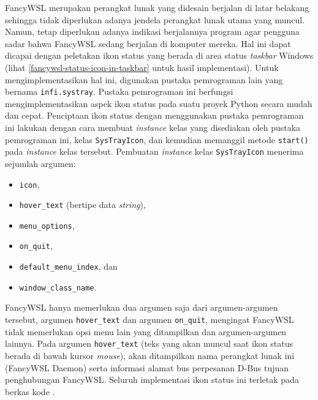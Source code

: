 FancyWSL merupakan perangkat lunak yang didesain berjalan di latar belakang sehingga tidak diperlukan adanya jendela perangkat lunak utama yang muncul. Namun, tetap diperlukan adanya indikasi berjalannya program agar pengguna sadar bahwa FancyWSL sedang berjalan di komputer mereka. Hal ini dapat dicapai dengan peletakan ikon status yang berada di area status \textit{taskbar} Windows (lihat \autoref{fancywsl-status-icon-in-taskbar} untuk hasil implementasi). Untuk mengimplementasikan hal ini, digunakan pustaka pemrograman lain yang bernama \verb|infi.systray|. Pustaka pemrograman ini berfungsi mengimplementasikan aspek ikon status pada suatu proyek Python secara mudah dan cepat. Penciptaan ikon status dengan menggunakan pustaka pemrograman ini lakukan dengan cara membuat \textit{instance} kelas yang disediakan oleh pustaka pemrograman ini, kelas \verb|SysTrayIcon|, dan kemudian memanggil metode \verb|start()| pada \textit{instance} kelas tersebut. Pembuatan \textit{instance} kelas \verb|SysTrayIcon| menerima sejumlah argumen:
\begin{itemize}
    \item \verb|icon|,
    \item \verb|hover_text| (bertipe data \textit{string}),
    \item \verb|menu_options|,
    \item \verb|on_quit|,
    \item \verb|default_menu_index|, dan
    \item \verb|window_class_name|.
\end{itemize}
FancyWSL hanya memerlukan dua argumen saja dari argumen-argumen tersebut, argumen \verb|hover_text| dan argumen \verb|on_quit|, mengingat FancyWSL tidak memerlukan opsi menu lain yang ditampilkan dan argumen-argumen lainnya. Pada argumen \verb|hover_text| (teks yang akan muncul saat ikon status berada di bawah kursor \textit{mouse}), akan ditampilkan nama perangkat lunak ini (FancyWSL Daemon) serta informasi alamat bus perpesanan D-Bus tujuan penghubungan FancyWSL. Seluruh implementasi ikon status ini terletak pada berkas kode .

